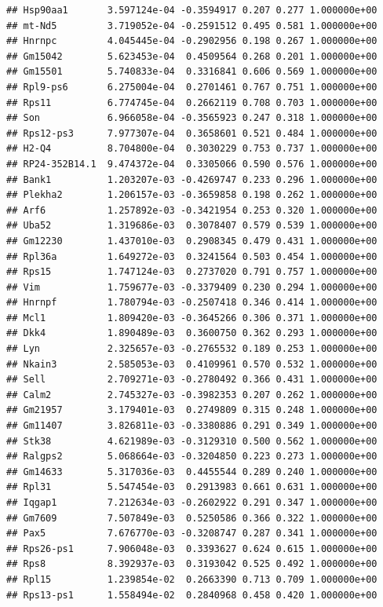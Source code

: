 \documentclass[
]{article}
\begin{document}
\begin{verbatim}
## Hsp90aa1       3.597124e-04 -0.3594917 0.207 0.277 1.000000e+00
## mt-Nd5         3.719052e-04 -0.2591512 0.495 0.581 1.000000e+00
## Hnrnpc         4.045445e-04 -0.2902956 0.198 0.267 1.000000e+00
## Gm15042        5.623453e-04  0.4509564 0.268 0.201 1.000000e+00
## Gm15501        5.740833e-04  0.3316841 0.606 0.569 1.000000e+00
## Rpl9-ps6       6.275004e-04  0.2701461 0.767 0.751 1.000000e+00
## Rps11          6.774745e-04  0.2662119 0.708 0.703 1.000000e+00
## Son            6.966058e-04 -0.3565923 0.247 0.318 1.000000e+00
## Rps12-ps3      7.977307e-04  0.3658601 0.521 0.484 1.000000e+00
## H2-Q4          8.704800e-04  0.3030229 0.753 0.737 1.000000e+00
## RP24-352B14.1  9.474372e-04  0.3305066 0.590 0.576 1.000000e+00
## Bank1          1.203207e-03 -0.4269747 0.233 0.296 1.000000e+00
## Plekha2        1.206157e-03 -0.3659858 0.198 0.262 1.000000e+00
## Arf6           1.257892e-03 -0.3421954 0.253 0.320 1.000000e+00
## Uba52          1.319686e-03  0.3078407 0.579 0.539 1.000000e+00
## Gm12230        1.437010e-03  0.2908345 0.479 0.431 1.000000e+00
## Rpl36a         1.649272e-03  0.3241564 0.503 0.454 1.000000e+00
## Rps15          1.747124e-03  0.2737020 0.791 0.757 1.000000e+00
## Vim            1.759677e-03 -0.3379409 0.230 0.294 1.000000e+00
## Hnrnpf         1.780794e-03 -0.2507418 0.346 0.414 1.000000e+00
## Mcl1           1.809420e-03 -0.3645266 0.306 0.371 1.000000e+00
## Dkk4           1.890489e-03  0.3600750 0.362 0.293 1.000000e+00
## Lyn            2.325657e-03 -0.2765532 0.189 0.253 1.000000e+00
## Nkain3         2.585053e-03  0.4109961 0.570 0.532 1.000000e+00
## Sell           2.709271e-03 -0.2780492 0.366 0.431 1.000000e+00
## Calm2          2.745327e-03 -0.3982353 0.207 0.262 1.000000e+00
## Gm21957        3.179401e-03  0.2749809 0.315 0.248 1.000000e+00
## Gm11407        3.826811e-03 -0.3380886 0.291 0.349 1.000000e+00
## Stk38          4.621989e-03 -0.3129310 0.500 0.562 1.000000e+00
## Ralgps2        5.068664e-03 -0.3204850 0.223 0.273 1.000000e+00
## Gm14633        5.317036e-03  0.4455544 0.289 0.240 1.000000e+00
## Rpl31          5.547454e-03  0.2913983 0.661 0.631 1.000000e+00
## Iqgap1         7.212634e-03 -0.2602922 0.291 0.347 1.000000e+00
## Gm7609         7.507849e-03  0.5250586 0.366 0.322 1.000000e+00
## Pax5           7.676770e-03 -0.3208747 0.287 0.341 1.000000e+00
## Rps26-ps1      7.906048e-03  0.3393627 0.624 0.615 1.000000e+00
## Rps8           8.392937e-03  0.3193042 0.525 0.492 1.000000e+00
## Rpl15          1.239854e-02  0.2663390 0.713 0.709 1.000000e+00
## Rps13-ps1      1.558494e-02  0.2840968 0.458 0.420 1.000000e+00

\end{verbatim}
\end{document}
